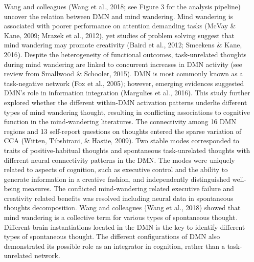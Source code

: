 Wang and colleagues (Wang et al., 2018; see Figure 3 for the analysis pipeline) uncover the relation between DMN and mind wandering. Mind wandering is associated with poorer performance on attention demanding tasks (McVay \& Kane, 2009; Mrazek et al., 2012), yet studies of problem solving suggest that mind wandering may promote creativity (Baird et al., 2012; Smeekens \& Kane, 2016). Despite the heterogeneity of functional outcomes, task-unrelated thoughts during mind wandering are linked to concurrent increases in DMN activity (see review from Smallwood \& Schooler, 2015). DMN is most commonly known as a task-negative network (Fox et al., 2005); however, emerging evidences suggested DMN’s role in information integration (Margulies et al., 2016). This study further explored whether the different within-DMN activation patterns underlie different types of mind wandering thought, resulting in conflicting associations to cognitive function in the mind-wandering literatures. The connectivity among 16 DMN regions and 13 self-report questions on thoughts entered the sparse variation of CCA (Witten, Tibshirani, \& Hastie, 2009). Two stable modes corresponded to traits of positive-habitual thoughts and spontaneous task-unrelated thoughts with different neural connectivity patterns in the DMN. The modes were uniquely related to aspects of cognition, such as executive control and the ability to generate information in a creative fashion, and independently distinguished well-being measures. The conflicted mind-wandering related executive failure and creativity related benefits was resolved including neural data in spontaneous thoughts decomposition. Wang and colleagues (Wang et al., 2018) showed that mind wandering is a collective term for various types of spontaneous thought. Different brain instantiations located in the DMN is the key to identify different types of spontaneous thought. The different configurations of DMN also demonstrated its possible role as an integrator in cognition, rather than a task-unrelated network. 

